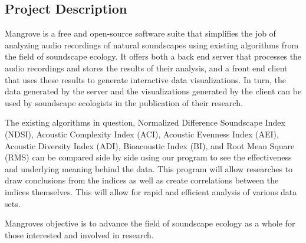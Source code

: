 \subsection{Project Description}
Mangrove is a free and open-source software suite that simplifies the job of analyzing audio recordings of natural soundscapes using existing algorithms from the field of soundscape ecology. It offers both a back end server that processes the audio recordings and stores the results of their analysis, and a front end client that uses these results to generate interactive data visualizations. In turn, the data generated by the server and the visualizations generated by the client can be used by soundscape ecologists in the publication of their research.\par
The existing algorithms in question, Normalized Difference Soundscape Index (NDSI), Acoustic Complexity Index (ACI), Acoustic Evenness Index (AEI), Acoustic Diversity Index (ADI), Bioacoustic Index (BI), and Root Mean Square (RMS) can be compared side by side using our program to see the effectiveness and underlying meaning behind the data. This program will allow researches to draw conclusions from the indices as well as create correlations between the indices themselves. This will allow for rapid and efficient analysis of various data sets.\par
Mangrove\textquotesingle s objective is to advance the field of soundscape ecology as a whole for those interested and involved in research.\par